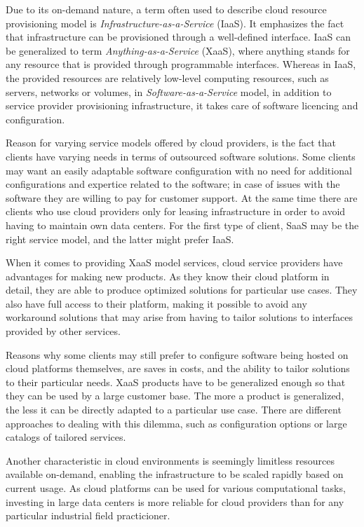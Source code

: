 \documentclass[officiallayout]{tktla}
\begin{document}
Due to its on-demand nature, a term often used to describe cloud resource
provisioning model is \textit{Infrastructure-as-a-Service} (IaaS). It
emphasizes the fact that infrastructure can be provisioned through a
well-defined interface. IaaS can be generalized to term
\textit{Anything-as-a-Service} (XaaS), where anything stands for any resource
that is provided through programmable interfaces. Whereas in IaaS, the provided
resources are relatively low-level computing resources, such as servers,
networks or volumes, in \textit{Software-as-a-Service} model, in addition to
service provider provisioning infrastructure, it takes care of software
licencing and configuration.

Reason for varying service models offered by cloud providers, is the fact that
clients have varying needs in terms of outsourced software solutions. Some
clients may want an easily adaptable software configuration with no need for
additional configurations and expertice related to the software; in case of
issues with the software they are willing to pay for customer support. At the
same time there are clients who use cloud providers only for leasing
infrastructure in order to avoid having to maintain own data centers. For the
first type of client, SaaS may be the right service model, and the latter might
prefer IaaS.

When it comes to providing XaaS model services, cloud service providers have
advantages for making new products. As they know their cloud platform in
detail, they are able to produce optimized solutions for particular use cases.
They also have full access to their platform, making it possible to avoid any
workaround solutions that may arise from having to tailor solutions to
interfaces provided by other services.

Reasons why some clients may still prefer to configure software being hosted on
cloud platforms themselves, are saves in costs, and the ability to tailor
solutions to their particular needs. XaaS products have to be generalized
enough so that they can be used by a large customer base. The more a product is
generalized, the less it can be directly adapted to a particular use case.
There are different approaches to dealing with this dilemma, such as
configuration options or large catalogs of tailored services.

Another characteristic in cloud environments is seemingly limitless resources
available on-demand, enabling the infrastructure to be scaled rapidly based on
current usage. As cloud platforms can be used for various computational tasks,
investing in large data centers is more reliable for cloud providers than for
any particular industrial field practicioner.
\end{document}
